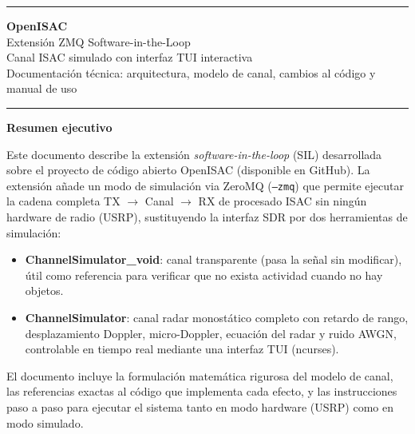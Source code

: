 \documentclass[11pt,a4paper]{article}
\begin{document}
\begin{titlepage}
\centering
\vspace*{1.5cm}
{\color{primary}\rule{\linewidth}{2pt}}\vspace{0.4cm}

{\Huge\bfseries\color{primary} OpenISAC}\\[0.4cm]
{\LARGE Extensión ZMQ Software-in-the-Loop}\\[0.3cm]
{\large Canal ISAC simulado con interfaz TUI interactiva}\\[0.3cm]
{\normalsize Documentación técnica: arquitectura, modelo de canal, cambios al código y manual de uso}

\vspace{0.4cm}
{\color{primary}\rule{\linewidth}{2pt}}

\vspace{1.5cm}

\begin{tcolorbox}[colback=secondary, colframe=primary, arc=5pt, boxrule=1pt]
\centering
\textbf{Resumen ejecutivo}\\[0.5em]
\begin{flushleft}
Este documento describe la extensión \textit{software-in-the-loop} (SIL) desarrollada sobre
el proyecto de código abierto OpenISAC (disponible en GitHub). La extensión añade un modo de
simulación via ZeroMQ (\texttt{--zmq}) que permite ejecutar la cadena completa
TX $\rightarrow$ Canal $\rightarrow$ RX de procesado ISAC sin ningún hardware de radio (USRP),
sustituyendo la interfaz SDR por dos herramientas de simulación:

\begin{itemize}[leftmargin=1em,topsep=0pt]
  \item \textbf{ChannelSimulator\_void}: canal transparente (pasa la señal sin modificar),
        útil como referencia para verificar que no exista actividad cuando no hay objetos.
  \item \textbf{ChannelSimulator}: canal radar monostático completo con retardo de rango,
        desplazamiento Doppler, micro-Doppler, ecuación del radar y ruido AWGN, controlable
        en tiempo real mediante una interfaz TUI (ncurses).
\end{itemize}

El documento incluye la formulación matemática rigurosa del modelo de canal, las referencias
exactas al código que implementa cada efecto, y las instrucciones paso a paso para ejecutar
el sistema tanto en modo hardware (USRP) como en modo simulado.
\end{flushleft}
\end{tcolorbox}


\end{titlepage}
\end{document}
